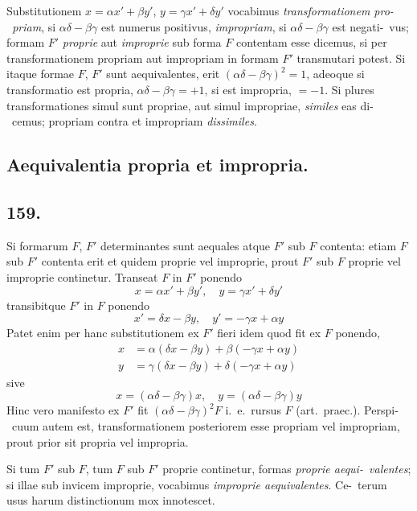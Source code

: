 \documentclass[12pt,a4paper]{article}
\theoremstyle{plain}
\theoremstyle{definition}
\theoremstyle{remark}
\begin{document}
Substitutionem $x = \alpha x' + \beta y'$, $y = \gamma x' + \delta y'$ vocabimus \emph{transformationem pro-\ priam}, si $\alpha\delta - \beta\gamma$ est numerus positivus, \emph{impropriam}, si $\alpha\delta - \beta\gamma$ est negati-\ vus; formam $F'$ \emph{proprie} aut \emph{improprie} sub forma $F$ contentam esse dicemus, si
per transformationem propriam aut impropriam in formam $F'$ transmutari potest.
Si itaque formae $F$, $F'$ sunt aequivalentes, erit $(\alpha\delta - \beta\gamma)^2 = 1$, adeoque si
transformatio est propria, $\alpha\delta - \beta\gamma = +1$, si est impropria, $= -1$. Si
plures transformationes simul sunt propriae, aut simul impropriae, \emph{similes} eas di-\ cemus; propriam contra et impropriam \emph{dissimiles}.

\subsection*{Aequivalentia propria et impropria.}

\subsection*{159.}

Si formarum $F$, $F'$ determinantes sunt aequales atque $F'$ sub $F$ contenta: etiam
$F$ sub $F'$ contenta erit et quidem proprie vel improprie, prout $F'$ sub $F$ proprie vel
improprie continetur. Transeat $F$ in $F'$ ponendo
\[
x = \alpha x' + \beta y', \quad y = \gamma x' + \delta y'
\]
transibitque $F'$ in $F$ ponendo
\[
x' = \delta x - \beta y, \quad y' = -\gamma x + \alpha y
\]
Patet enim per hanc substitutionem ex $F'$ fieri idem quod fit ex $F$ ponendo,
\begin{align*}
x &= \alpha(\delta x - \beta y) + \beta(-\gamma x + \alpha y) \\
y &= \gamma(\delta x - \beta y) + \delta(-\gamma x + \alpha y)
\end{align*}
sive
\[
x = (\alpha\delta - \beta\gamma)x, \quad y = (\alpha\delta - \beta\gamma)y
\]
Hinc vero manifesto ex $F'$ fit $(\alpha\delta - \beta\gamma)^2 F$ i.~e.\ rursus $F$ (art.\ praec.). Perspi-\ cuum autem est, transformationem posteriorem esse propriam vel impropriam,
prout prior sit propria vel impropria.

Si tum $F'$ sub $F$, tum $F$ sub $F'$ proprie continetur, formas \emph{proprie aequi-\ valentes}; si illae sub invicem improprie, vocabimus \emph{improprie aequivalentes}. Ce-\ terum usus harum distinctionum mox innotescet.
\end{document}
